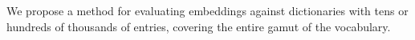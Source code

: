 We propose a method for evaluating embeddings against dictionaries with tens or hundreds of thousands of entries, covering the entire gamut of the vocabulary.
